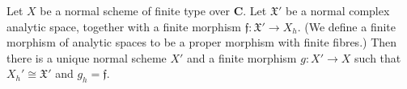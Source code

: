 Let $X$ be a normal scheme of finite type over $\mathbf{C}$. Let $\mathfrak{X}'$ be a normal complex analytic space, together with a finite morphism $\mathfrak{f}: \mathfrak{X}' \rightarrow X_h$. (We define a finite morphism of analytic spaces to be a proper morphism with finite fibres.) Then there is a unique normal scheme $X'$ and a finite morphism $g: X' \rightarrow X$ such that $X_h' \cong \mathfrak{X}'$ and $g_h = \mathfrak{f}$.
